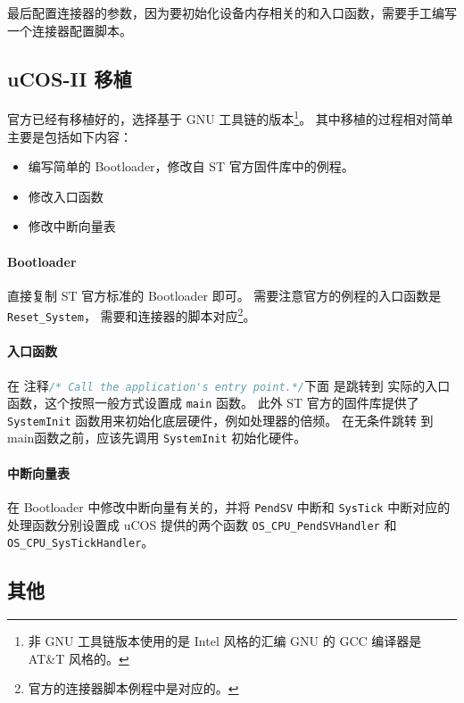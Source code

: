 \documentclass{ctexart}
\begin{document}
    最后配置连接器的参数，因为要初始化设备内存相关的和入口函数，需要手工编写一个连接器配置脚本。
    
    \subsection{uCOS-II 移植}
    \label{sec:ucosii-transplate:tp}
    
    官方已经有移植好的，选择基于 GNU 工具链的版本\footnote{非 GNU 工具链版本使用的是 Intel 风格的汇编
    GNU 的 GCC 编译器是 AT\&T 风格的。}。
    其中移植的过程相对简单主要是包括如下内容：
    \begin{itemize}
        \item 编写简单的 Bootloader，修改自 ST 官方固件库中的例程。
        \item 修改入口函数
        \item 修改中断向量表
    \end{itemize}

    \paragraph{Bootloader}
    直接复制 ST 官方标准的 Bootloader 即可。 需要注意官方的例程的入口函数是 \lstinline|Reset_System|，
    需要和连接器的脚本对应\footnote{官方的连接器脚本例程中是对应的。}。
    
    \paragraph{入口函数}
    在 注释\lstinline[language=C]|/* Call the application's entry point.*/|下面
    是跳转到 实际的入口函数，这个按照一般方式设置成 \lstinline|main| 函数。
    此外 ST 官方的固件库提供了 \lstinline|SystemInit| 函数用来初始化底层硬件，例如处理器的倍频。
    在无条件跳转 到main函数之前，应该先调用 \lstinline|SystemInit| 初始化硬件。
    
    \paragraph{中断向量表}
    在 Bootloader 中修改中断向量有关的，并将 \verb|PendSV| 中断和 \verb|SysTick| 中断对应的
    处理函数分别设置成 uCOS 提供的两个函数 \lstinline|OS_CPU_PendSVHandler| 和 \lstinline|OS_CPU_SysTickHandler|。
    
    \subsection{其他}
    \label{sec:ucosii-transplate:more}
     
\end{document}
